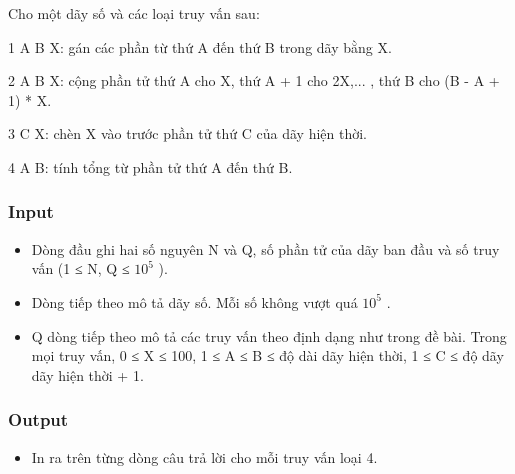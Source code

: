 



   Cho một dãy số và các loại truy vấn sau:  

   1 A B X: gán các phần từ thứ A đến thứ B trong dãy bằng X.  

   2 A B X: cộng phần tử thứ A cho X, thứ A + 1 cho 2X,... , thứ B cho (B - A + 1) * X.  

   3 C X: chèn X vào trước phần tử thứ C của dãy hiện thời.  

   4 A B: tính tổng từ phần tử thứ A đến thứ B.  

\subsubsection{   Input  }
\begin{itemize}
	\item     Dòng đầu ghi hai số nguyên N và Q, số phần tử của dãy ban đầu và số truy vấn (1 ≤ N, Q ≤ $10^{5}$    ).   
	\item     Dòng tiếp theo mô tả dãy số. Mỗi số không vượt quá $10^{5}$    .   
	\item     Q dòng tiếp theo mô tả các truy vấn theo định dạng như trong đề bài. Trong mọi truy vấn, 0 ≤ X ≤ 100, 1 ≤ A ≤ B ≤ độ dài dãy hiện thời, 1 ≤ C ≤ độ dãy dãy hiện thời + 1.   
\end{itemize}

\subsubsection{   Output  }
\begin{itemize}
	\item     In ra trên từng dòng câu trả lời cho mỗi truy vấn loại 4.   
\end{itemize}

